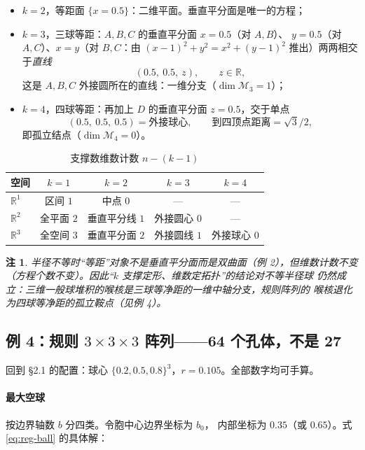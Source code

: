 \documentclass[UTF8,zihao=-4]{ctexart}
\newcommand{\R}{\mathbb{R}}
\newtheorem{remark}[definition]{注}
\begin{document}
\begin{itemize}
  \item $k=2$，等距面 $\{x=0.5\}$：二维平面。垂直平分面是唯一的方程；
  \item $k=3$，三球等距：$A,B,C$ 的垂直平分面 $x=0.5$（对 $A,B$）、
  $y=0.5$（对 $A,C$）、$x=y$（对 $B,C$：由
  $(x-1)^2+y^2=x^2+(y-1)^2$ 推出）两两相交于\emph{直线}
  \begin{equation}
    (0.5,\ 0.5,\ z),\qquad z\in\R,
  \end{equation}
  这是 $A,B,C$ 外接圆所在的直线：一维分支（$\dim\mathcal M_3=1$）；
  \item $k=4$，四球等距：再加上 $D$ 的垂直平分面 $z=0.5$，交于单点
  \begin{equation}
    (0.5,\ 0.5,\ 0.5)=\text{外接球心},\qquad
    \text{到四顶点距离}=\sqrt{3}/2,
  \end{equation}
  即孤立结点（$\dim\mathcal M_4=0$）。
\end{itemize}

\begin{table}[htbp]
\centering
\caption{支撑数维数计数 $n-(k-1)$}
\label{tab:dim-count}
\small
\begin{tabular}{lcccc}
\toprule
空间 & $k=1$ & $k=2$ & $k=3$ & $k=4$\\
\midrule
$\R^1$ & 区间 $1$ & 中点 $0$ & --- & ---\\
$\R^2$ & 全平面 $2$ & 垂直平分线 $1$ & 外接圆心 $0$ & ---\\
$\R^3$ & 全空间 $3$ & 垂直平分面 $2$ & 外接圆线 $1$ & 外接球心 $0$\\
\bottomrule
\end{tabular}
\end{table}

\begin{remark}
  半径不等时``等距''对象不是垂直平分面而是双曲面（例 2），但维数计数不变
  （方程个数不变）。因此``$k$ 支撑定形、维数定拓扑''的结论对不等半径球
  仍然成立：三维一般球堆积的喉核是三球等净距的一维中轴分支，规则阵列的
  喉核退化为四球等净距的孤立鞍点（见例 4）。
\end{remark}

\subsection{例 4：规则 $3\times3\times3$ 阵列——64 个孔体，不是 27}

回到 \S2.1 的配置：球心 $\{0.2,0.5,0.8\}^3$，$r=0.105$。全部数字均可手算。

\paragraph{最大空球} 按边界轴数 $b$ 分四类。令胞中心边界坐标为 $b_0$，
内部坐标为 $0.35$（或 $0.65$）。式 \eqref{eq:reg-ball} 的具体解：
\end{document}
